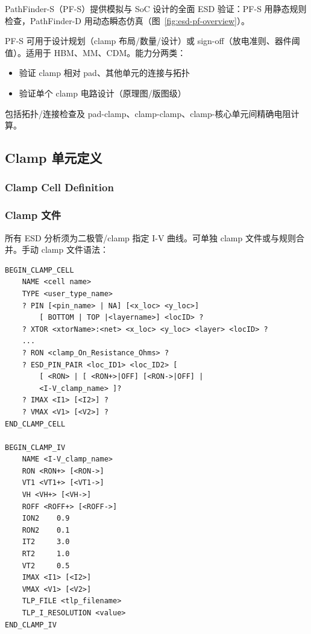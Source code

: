 PathFinder-S（PF-S）提供模拟与 SoC 设计的全面 ESD 验证：PF-S 用静态规则检查，PathFinder-D 用动态瞬态仿真（图~\ref{fig:esd-pf-overview}）。


PF-S 可用于设计规划（clamp 布局/数量/设计）或 sign-off（放电准则、器件阈值）。适用于 HBM、MM、CDM。能力分两类：
\begin{itemize}
  \item 验证 clamp 相对 pad、其他单元的连接与拓扑
  \item 验证单个 clamp 电路设计（原理图/版图级）
\end{itemize}

包括拓扑/连接检查及 pad-clamp、clamp-clamp、clamp-核心单元间精确电阻计算。

\subsection{Clamp 单元定义}
\subsubsection*{Clamp Cell Definition}

\subsubsection{Clamp 文件}
所有 ESD 分析须为二极管/clamp 指定 I-V 曲线。可单独 clamp 文件或与规则合并。手动 clamp 文件语法：
\begin{lstlisting}
BEGIN_CLAMP_CELL
    NAME <cell name>
    TYPE <user_type_name>
    ? PIN [<pin_name> | NA] [<x_loc> <y_loc>]
        [ BOTTOM | TOP |<layername>] <locID> ?
    ? XTOR <xtorName>:<net> <x_loc> <y_loc> <layer> <locID> ?
    ...
    ? RON <clamp_On_Resistance_Ohms> ?
    ? ESD_PIN_PAIR <loc_ID1> <loc_ID2> [
        [ <RON> | [ <RON+>|OFF] [<RON->|OFF] |
        <I-V_clamp_name> ]?
    ? IMAX <I1> [<I2>] ?
    ? VMAX <V1> [<V2>] ?
END_CLAMP_CELL

BEGIN_CLAMP_IV
    NAME <I-V_clamp_name>
    RON <RON+> [<RON->]
    VT1 <VT1+> [<VT1->]
    VH <VH+> [<VH->]
    ROFF <ROFF+> [<ROFF->]
    ION2    0.9
    RON2    0.1
    IT2     3.0
    RT2     1.0
    VT2     0.5
    IMAX <I1> [<I2>]
    VMAX <V1> [<V2>]
    TLP_FILE <tlp_filename>
    TLP_I_RESOLUTION <value>
END_CLAMP_IV
\end{lstlisting}

